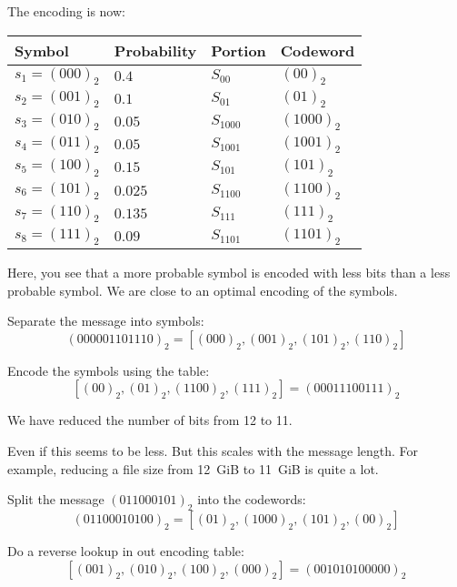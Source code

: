 \begin{solution}
\begin{tasks}
		The encoding is now:
		\begin{table}[H]
			\centering
			\begin{tabular}{|l|l|l|l|}
				\hline
				Symbol & Probability & Portion & Codeword \\
				\hline
				\hline
				$s_1 = (000)_2$ & $0.4$ & $S_{00}$ & $(00)_2$ \\
				\hline
				$s_2 = (001)_2$ & $0.1$ & $S_{01}$ & $(01)_2$ \\
				\hline
				$s_3 = (010)_2$ & $0.05$ & $S_{1000}$ & $(1000)_2$ \\
				\hline
				$s_4 = (011)_2$ & $0.05$ & $S_{1001}$ & $(1001)_2$ \\
				\hline
				$s_5 = (100)_2$ & $0.15$ & $S_{101}$ & $(101)_2$ \\
				\hline
				$s_6 = (101)_2$ & $0.025$ & $S_{1100}$ & $(1100)_2$ \\
				\hline
				$s_7 = (110)_2$ & $0.135$ & $S_{111}$ & $(111)_2$ \\
				\hline
				$s_8 = (111)_2$ & $0.09$ & $S_{1101}$ & $(1101)_2$ \\
				\hline
			\end{tabular}
		\end{table}
		Here, you see that a more probable symbol is encoded with less bits than a less probable symbol. We are close to an optimal encoding of the symbols.
		
		\task
		Separate the message into symbols:
		\begin{equation*}
			\left(000001101110\right)_2 = \left[\left(000\right)_2, \left(001\right)_2, \left(101\right)_2, \left(110\right)_2\right]
		\end{equation*}
	
		Encode the symbols using the table:
		\begin{equation*}
			\left[\left(00\right)_2, \left(01\right)_2, \left(1100\right)_2, \left(111\right)_2\right] = \left(00011100111\right)_2
		\end{equation*}
	
		We have reduced the number of bits from 12 to 11.
		
		Even if this seems to be less. But this scales with the message length. For example, reducing a file size from \SI{12}{GiB} to \SI{11}{GiB} is quite a lot.
		
		\task
		Split the message $\left(011000101\right)_2$ into the codewords:
		\begin{equation*}
			\left(01100010100\right)_2 = \left[\left(01\right)_2, \left(1000\right)_2, \left(101\right)_2, \left(00\right)_2\right]
		\end{equation*}
	
		Do a reverse lookup in out encoding table:
		\begin{equation*}
			\left[\left(001\right)_2, \left(010\right)_2, \left(100\right)_2, \left(000\right)_2\right] = \left(001010100000\right)_2
		\end{equation*}
	\end{tasks}
\end{solution}

